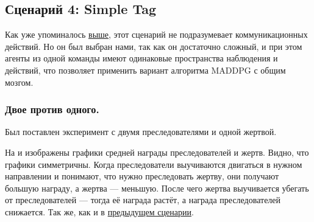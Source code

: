 \subsection{Сценарий 4: Simple Tag}

Как уже упоминалось \hyperref[exp-st]{выше}, этот сценарий не подразумевает коммуникационных действий. Но он был выбран нами, так как он достаточно сложный, и при этом агенты из одной команды имеют одинаковые пространства наблюдения и действий, что позволяет применить вариант алгоритма MADDPG с общим мозгом.

\subsubsection{Двое против одного.}

Был поставлен эксперимент с двумя преследователями и одной жертвой.

На  и  изображены графики средней награды преследователей и жертв. Видно, что графики симметричны. Когда преследователи выучиваются двигаться в нужном направлении и понимают, что нужно преследовать жертву, они получают большую награду, а жертва --- меньшую. После чего жертва выучивается убегать от преследователей --- тогда её награда растёт, а награда преследователей снижается. Так же, как и в \hyperref[exp-results-svc]{предыдущем сценарии}.

